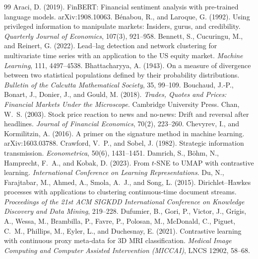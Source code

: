 \documentclass{article}
\theoremstyle{plain}
\theoremstyle{definition}
\theoremstyle{remark}
\begin{document}
{\small
\begin{thebibliography}{99}
 Araci, D. (2019). FinBERT: Financial sentiment analysis with pre-trained language models. arXiv:1908.10063.
 B\'enabou, R., and Laroque, G. (1992). Using privileged information to manipulate markets: Insiders, gurus, and credibility. \emph{Quarterly Journal of Economics}, 107(3), 921--958.
 Bennett, S., Cucuringu, M., and Reinert, G. (2022). Lead--lag detection and network clustering for multivariate time series with an application to the US equity market. \emph{Machine Learning}, 111, 4497--4538.
 Bhattacharyya, A. (1943). On a measure of divergence between two statistical populations defined by their probability distributions. \emph{Bulletin of the Calcutta Mathematical Society}, 35, 99--109.
 Bouchaud, J.-P., Bonart, J., Donier, J., and Gould, M. (2018). \emph{Trades, Quotes and Prices: Financial Markets Under the Microscope}. Cambridge University Press.
 Chan, W.~S. (2003). Stock price reaction to news and no-news: Drift and reversal after headlines. \emph{Journal of Financial Economics}, 70(2), 223--260.
 Chevyrev, I., and Kormilitzin, A. (2016). A primer on the signature method in machine learning. arXiv:1603.03788.
 Crawford, V.~P., and Sobel, J. (1982). Strategic information transmission. \emph{Econometrica}, 50(6), 1431--1451.
 Damrich, S., B\"ohm, N., Hamprecht, F.~A., and Kobak, D. (2023). From $t$-SNE to UMAP with contrastive learning. \emph{International Conference on Learning Representations}.
 Du, N., Farajtabar, M., Ahmed, A., Smola, A.~J., and Song, L. (2015). Dirichlet--Hawkes processes with applications to clustering continuous-time document streams. \emph{Proceedings of the 21st ACM SIGKDD International Conference on Knowledge Discovery and Data Mining}, 219--228.
 Dufumier, B., Gori, P., Victor, J., Grigis, A., Wessa, M., Brambilla, P., Favre, P., Polosan, M., McDonald, C., Piguet, C.~M., Phillips, M., Eyler, L., and Duchesnay, E. (2021). Contrastive learning with continuous proxy meta-data for 3D MRI classification. \emph{Medical Image Computing and Computer Assisted Intervention (MICCAI)}, LNCS 12902, 58--68.

\end{thebibliography}}
\end{document}
